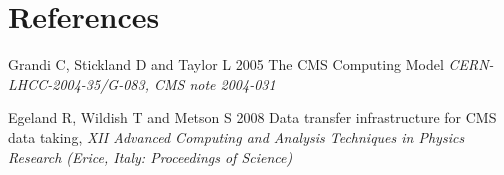 \section*{References}

\begin{thebibliography}{1}

  Grandi C, Stickland D and Taylor L 2005 The CMS Computing Model {\it CERN-LHCC-2004-35/G-083, CMS note 2004-031}

  Egeland R, Wildish T and Metson S 2008 Data transfer infrastructure for CMS data taking,  {\it XII Advanced Computing and Analysis Techniques in Physics Research (Erice, Italy: Proceedings of Science)}



\end{thebibliography}
